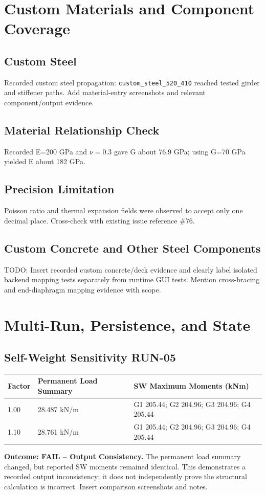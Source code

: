 \documentclass[11pt,a4paper]{report}
\begin{document}
\chapter{Custom Materials and Component Coverage}
\section{Custom Steel}
Recorded custom steel propagation: \texttt{custom\_steel\_520\_410} reached tested girder and stiffener paths. Add material-entry screenshots and relevant component/output evidence.
\section{Material Relationship Check}
Recorded E=200 GPa and $\nu=0.3$ gave G about 76.9 GPa; using G=70 GPa yielded E about 182 GPa.
\section{Precision Limitation}
Poisson ratio and thermal expansion fields were observed to accept only one decimal place. Cross-check with existing issue reference \#76.
\section{Custom Concrete and Other Steel Components}
TODO: Insert recorded custom concrete/deck evidence and clearly label isolated backend mapping tests separately from runtime GUI tests. Mention cross-bracing and end-diaphragm mapping evidence with scope.

\chapter{Multi-Run, Persistence, and State}
\section{Self-Weight Sensitivity RUN-05}
\begin{longtable}{p{}p{}p{}}
\toprule Factor & Permanent Load Summary & SW Maximum Moments (kNm)\\\midrule
1.00 & 28.487 kN/m & G1 205.44; G2 204.96; G3 204.96; G4 205.44\\
1.10 & 28.761 kN/m & G1 205.44; G2 204.96; G3 204.96; G4 205.44\\
\bottomrule
\end{longtable}
\textbf{Outcome: FAIL -- Output Consistency.} The permanent load summary changed, but reported SW moments remained identical. This demonstrates a recorded output inconsistency; it does not independently prove the structural calculation is incorrect. Insert comparison screenshots and notes.
\end{document}
